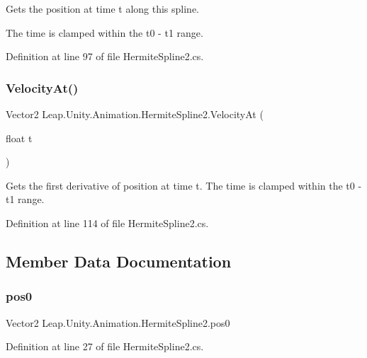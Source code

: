 Gets the position at time t along this spline. 

The time is clamped within the t0 -\/ t1 range. 

Definition at line 97 of file Hermite\+Spline2.\+cs.

\mbox{\label{struct_leap_1_1_unity_1_1_animation_1_1_hermite_spline2_a77bfc75b6d8f06124dbded5928e23140}} 
\subsubsection{\texorpdfstring{VelocityAt()}{VelocityAt()}}
{\footnotesize\ttfamily Vector2 Leap.\+Unity.\+Animation.\+Hermite\+Spline2.\+Velocity\+At (\begin{DoxyParamCaption}\item[{float}]{t }\end{DoxyParamCaption})}



Gets the first derivative of position at time t. The time is clamped within the t0 -\/ t1 range. 



Definition at line 114 of file Hermite\+Spline2.\+cs.



\subsection{Member Data Documentation}
\mbox{\label{struct_leap_1_1_unity_1_1_animation_1_1_hermite_spline2_a34b8ac4e587d68ca8a12eb4bd0b49173}} 
\subsubsection{\texorpdfstring{pos0}{pos0}}
{\footnotesize\ttfamily Vector2 Leap.\+Unity.\+Animation.\+Hermite\+Spline2.\+pos0}



Definition at line 27 of file Hermite\+Spline2.\+cs.

